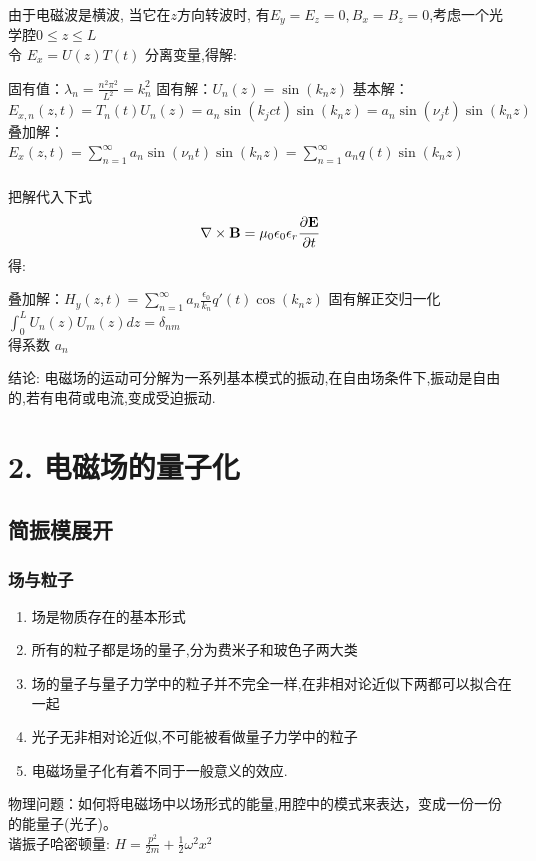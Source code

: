 \begin{frame}
      \frametitle{}
      由于电磁波是横波, 当它在$z$方向转波时, 有$E_y=E_z=0, B_x=B_z=0$,考虑一个光学腔$0\leq z\leq L$\\ \vspace*{0.6em}
      令 $E_x =U(z)T(t)$ 分离变量,得解:
      \begin{enumerate}
		\IItem 固有值：$\displaystyle  \lambda_n=\frac{n^2\pi^2}{L^2}= k^2 _n $ 
		\IItem 固有解：$\displaystyle  U_n(z)=\sin (k_n z) $
        \IItem 基本解：$\displaystyle E_{x,n}(z,t) = T_n(t) U_n(z)=a_n \sin (k_j ct )\sin (k_n z) = a_n \sin (\nu_j t) \sin (k_n z) $
        \IItem 叠加解：$\displaystyle E_{x}(z,t) = \sum\limits_{n=1}^{\infty } a_n\sin (\nu_n t) \sin (k_n z) = \sum\limits_{n=1}^{\infty } a_n q (t) \sin (k_n z)$
	\end{enumerate}	      
\end{frame}

\begin{frame}
      \frametitle{}
      把解代入下式
      \[ \nabla \times \mathbf{B} = \mu_0\epsilon_0 \epsilon_r \cfrac{\partial \mathbf{E}} {\partial t } \]
      得: 
      \begin{enumerate}
        \IItem 叠加解：$\displaystyle H_{y}(z,t) = \sum\limits_{n=1}^{\infty } a_n \frac{\epsilon_0}{k_n}q' (t) \cos (k_n z)$
        \IItem 固有解正交归一化 $ \int^L _0 U_n(z) U_m(z)dz =\delta_{nm} $  \\ 
         得系数  $a_n $
	\end{enumerate}	
    结论: 电磁场的运动可分解为一系列基本模式的振动,在自由场条件下,振动是自由的,若有电荷或电流,变成受迫振动.
\end{frame}

\section{2. 电磁场的量子化}
\subsection{简振模展开}
\begin{frame}
    \frametitle{场与粒子}
    \begin{enumerate}
        \item 场是物质存在的基本形式
        \item 所有的粒子都是场的量子,分为费米子和玻色子两大类
        \item 场的量子与量子力学中的粒子并不完全一样,在非相对论近似下两都可以拟合在一起
        \item 光子无非相对论近似,不可能被看做量子力学中的粒子
        \item 电磁场量子化有着不同于一般意义的效应.
    \end{enumerate}
    物理问题：如何将电磁场中以场形式的能量,用腔中的模式来表达，变成一份一份的能量子(光子)。\\ 
    谐振子哈密顿量: $ H = \frac{p^2}{2m} +\frac{1}{2} \omega ^2 x^2 $
\end{frame}

